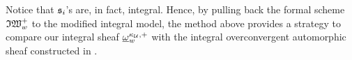 \begin{Remark}\label{Remark: comparison of the integral sheaf}
\normalfont Notice that $\operatorname{\mathfrak{s}}_i$'s are, in fact, integral. Hence, by pulling back the formal scheme $\operatorname{\mathfrak{IW}}_{w}^+$ to the modified integral model, the method above provides a strategy to compare our integral sheaf $\underline{\omega}_{w}^{\kappa_{\operatorname{\mathcal{U}}}, +}$ with the integral overconvergent automorphic sheaf constructed in \cite{AIP-2015}. 
\end{Remark}